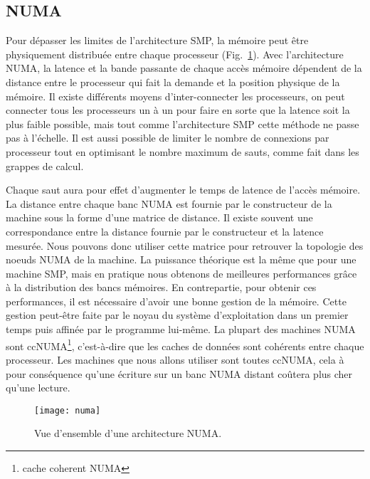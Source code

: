 \subsection{NUMA}
Pour dépasser les limites de l'architecture SMP, la mémoire peut être physiquement distribuée entre chaque processeur (Fig.~\ref{fig:numa}).
%
Avec l'architecture NUMA, la latence et la bande passante de chaque accès mémoire dépendent de la distance entre le processeur qui fait la demande et la position physique de la mémoire.
%
Il existe différents moyens d'inter-connecter les processeurs, on peut connecter tous les processeurs un à un pour faire en sorte que la latence soit la plus faible possible, mais tout comme l'architecture SMP cette méthode ne passe pas à l'échelle.
%
Il est aussi possible de limiter le nombre de connexions par processeur tout en optimisant le nombre maximum de sauts, comme fait dans les grappes de calcul.



Chaque saut aura pour effet d'augmenter le temps de latence de l'accès mémoire.
%
La distance entre chaque banc NUMA est fournie par le constructeur de la machine sous la forme d'une matrice de distance.
%
Il existe souvent une correspondance entre la distance fournie par le constructeur et la latence mesurée.
%
Nous pouvons donc utiliser cette matrice pour retrouver la topologie des noeuds NUMA de la machine.
%
La puissance théorique est la même que pour une machine SMP, mais en pratique nous obtenons de meilleures performances grâce à la distribution des bancs mémoires.
%
En contrepartie, pour obtenir ces performances, il est nécessaire d'avoir une bonne gestion de la mémoire.
%
Cette gestion peut-être faite par le noyau du système d'exploitation dans un premier temps puis affinée par le programme lui-même.
%
La plupart des machines NUMA sont ccNUMA\footnote{cache coherent NUMA}, c'est-à-dire que les caches de données sont cohérents entre chaque processeur.
%
Les machines que nous allons utiliser sont toutes ccNUMA, cela à pour conséquence qu'une écriture sur un banc NUMA distant coûtera plus cher qu'une lecture.

\begin{figure}[!h]
  \centering
  \texttt{[image: numa]}
  \caption{Vue d'ensemble d'une architecture NUMA.}
  \label{fig:numa}
\end{figure}
